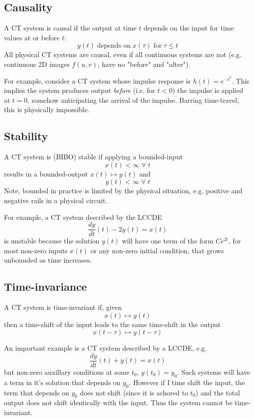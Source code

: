 \subsection{Causality}
A CT system is causal if the output at time $t$ depends on the input for time values at or before $t$:
\[
y(t) \;\text{depends on}\; x(\tau) \;\text{for} \; \tau \leq t
\]
All physical CT systems are causal, even if all continuous systems are not (e.g. continuous 2D images $f(u,v)$, have no "before" and "after").

For example, consider a CT system whose impulse response is $h(t) = e^{-t^2}$. This implies the system produces output \emph{before} (i.e. for $t < 0$) the impulse is applied at $t=0$, somehow anticipating the arrival of the impulse. Barring time-travel, this is physically impossible.

\subsection{Stability}

A CT system is (BIBO) stable if applying a bounded-input
\[
x(t) < \infty \; \forall \; t
\]
results in a bounded-output $x(t) \mapsto y(t)$ and 
\[
y(t) < \infty \; \forall \; t
\]
Note, bounded in practice is limited by the physical situation, e.g. positive and negative rails in a physical circuit.

For example, a CT system described by the LCCDE
\[
\frac{dy}{dt}(t) - 2y(t) = x(t)
\]
is unstable because the solution $y(t)$ will have one term of the form $Ce^{2t}$, for most non-zero inputs $x(t)$ or any non-zero initial condition, that grows unbounded as time increases.

\subsection{Time-invariance}
A CT system is time-invariant if, given
\[
x(t) \mapsto y(t)
\]
then a time-shift of the input leads to the same time-shift in the output
\[
x(t-\tau) \mapsto y(t-\tau)
\]

An important example is a CT system described by a LCCDE, e.g.
\[
\frac{dy}{dt}(t) + y(t) = x(t)
\]
but non-zero auxillary conditions at some $t_0$, $y(t_0) = y_0$. Such systems will have a term in it's solution that depends on $y_0$. However if I time shift the input, the term that depends on $y_0$ does not shift (since it is achored to $t_0$) and the total output does not shift identically with the input. Thus the system cannot be time-invariant.

